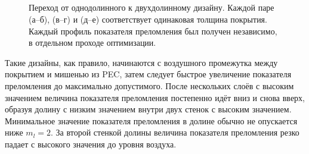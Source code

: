 \begin{figure}[p]
  \begin{minipage}[h]{0.45\textwidth}
  \end{minipage}
  \begin{minipage}[h]{0.45\textwidth}
  \end{minipage}\\
  \vspace{12pt}\\
  \begin{minipage}[h]{0.45\textwidth}
  \end{minipage}
  \begin{minipage}[h]{0.45\textwidth}
  \end{minipage}\\
  \vspace{12pt}\\
  \begin{minipage}[h]{0.45\textwidth}
  \end{minipage}
  \begin{minipage}[h]{0.45\textwidth}
  \end{minipage}%
  \caption{Переход от однодолинного к двухдолинному дизайну. Каждой
    паре (а--б), (в--г) и (д--е) соответствует одинаковая толщина
    покрытия. Каждый профиль показателя преломления был получен
    независимо, в отдельном проходе оптимизации.
    \label{img:transition}}%
\end{figure}
Такие дизайны, как правило, начинаются с воздушного промежутка между
покрытием и мишенью из PEC, затем следует быстрое увеличение
показателя преломления до максимально допустимого. После нескольких
слоёв с высоким значением величина показателя преломления постепенно
идёт вниз и снова вверх, образуя долину с низким значением внутри двух
стенок с высоким значением. Минимальное значение показателя
преломления в долине обычно не опускается ниже $m_l = 2$. За второй стенкой
долины величина показателя преломления резко падает с высокого значения до
уровня воздуха.


